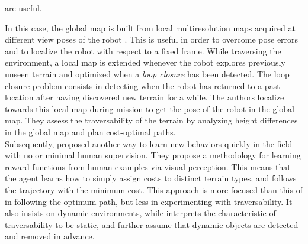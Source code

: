 \documentclass[12pt,a4paper,table,dvipsnames,tikz]{report}
\newcommand{\term}{\textit}
\begin{document}
	are useful. 
	\par
	In this case, the global map is built from local multiresolution maps acquired at 
	different view poses of the robot \citep{Droeschel}. This is useful in order to 
	overcome pose errors and to localize the robot with respect to a fixed frame. 
	While traversing the environment, a local map is extended whenever the robot 
	explores previously unseen terrain and optimized when a \term{loop closure} has 
	been detected. The loop closure problem consists in detecting when the robot has 
	returned to a past location after having discovered new terrain for a while. The 
	authors localize towards this local map during mission to get the pose of the 
	robot in the global map. They assess the traversability of the terrain by 
	analyzing height differences in the global map and plan cost-optimal paths.
	\\
	
	Subsequently, \citet{Wigness} proposed another way to learn new behaviors quickly 
	in the field with no or minimal human supervision. They propose a methodology for 
	learning reward functions from human examples via visual perception. This means 
	that the agent learns how to simply assign costs to distinct terrain types, and 
	follows the trajectory with the minimum cost. This approach is more focused than 
	this of \citet{Suger} in following the optimum path, but less in experimenting 
	with traversability. It also insists on dynamic environments, while \citet{Suger} 
	interprets the characteristic of traversability to be static, and further assume 
	that dynamic objects are detected and removed in advance.
	\\
	
\end{document}
